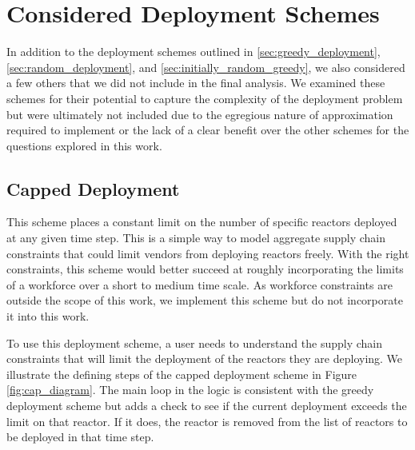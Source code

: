 \chapter{Considered Deployment Schemes}
\label{sec:considered_deployment_schemes}
In addition to the deployment schemes outlined in \ref{sec:greedy_deployment},
\ref{sec:random_deployment}, and \ref{sec:initially_random_greedy}, we also
considered a few others that we did not include in the final analysis. We
examined these schemes for their potential to capture the complexity of the
deployment problem but were ultimately not included due to the egregious nature
of approximation required to implement or the lack of a clear benefit over the
other schemes for the questions explored in this work.

\section{Capped Deployment}
\label{sec:capped_deployment}
This scheme places a constant limit on the number of specific reactors deployed
at any given time step. This is a simple way to model aggregate supply chain
constraints that could limit vendors from deploying reactors freely. With the
right constraints, this scheme would better succeed at roughly incorporating
the limits of a workforce over a short to medium time scale. As workforce
constraints are outside the scope of this work, we implement this scheme but do
not incorporate it into this work.

To use this deployment scheme, a user needs to understand the supply chain
constraints that will limit the deployment of the reactors they are deploying.
We illustrate the defining steps of the capped deployment scheme in Figure
\ref{fig:cap_diagram}. The main loop in the logic is consistent with the greedy
deployment scheme but adds a check to see if the current deployment exceeds the
limit on that reactor. If it does, the reactor is removed from the list of
reactors to be deployed in that time step.

